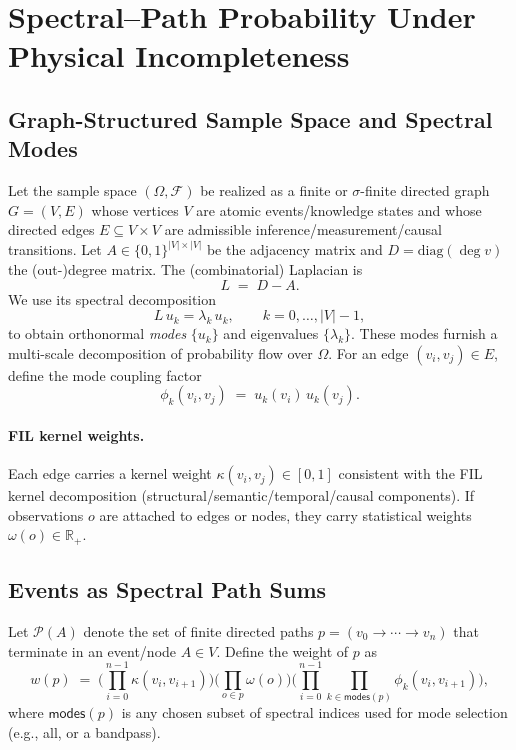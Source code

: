 \section{Spectral–Path Probability Under Physical Incompleteness}
\label{sec:spectral-path-prob-PI}

\subsection{Graph-Structured Sample Space and Spectral Modes}
\label{subsec:sample-graph-spectral}

Let the sample space $(\Omega,\mathcal{F})$ be realized as a finite or $\sigma$-finite directed graph
$G=(V,E)$ whose vertices $V$ are atomic events/knowledge states and whose directed edges
$E\subseteq V\times V$ are admissible inference/measurement/causal transitions.
Let $A\in\{0,1\}^{|V|\times|V|}$ be the adjacency matrix and $D=\mathrm{diag}(\deg v)$ the
(out-)degree matrix. The (combinatorial) Laplacian is
\[
L \;=\; D-A.
\]
We use its spectral decomposition
\[
L\,u_k=\lambda_k\,u_k,\qquad k=0,\dots,|V|-1,
\]
to obtain orthonormal \emph{modes} $\{u_k\}$ and eigenvalues $\{\lambda_k\}$. These modes furnish a
multi-scale decomposition of probability flow over $\Omega$.
For an edge $(v_i,v_j)\in E$, define the mode coupling factor
\begin{equation}
\phi_k(v_i,v_j)\;=\;u_k(v_i)\,u_k(v_j).
\label{eq:mode-coupling}
\end{equation}

\paragraph{FIL kernel weights.}
Each edge carries a kernel weight $\kappa(v_i,v_j)\in[0,1]$ consistent with the FIL kernel
decomposition (structural/semantic/temporal/causal components).
If observations $o$ are attached to edges or nodes, they carry statistical weights $\omega(o)\in\mathbb{R}_+$.

\subsection{Events as Spectral Path Sums}
\label{subsec:events-as-path-sums}

Let $\mathcal{P}(A)$ denote the set of finite directed paths $p=(v_0\!\to\!\cdots\!\to\!v_n)$ that
terminate in an event/node $A\in V$. Define the weight of $p$ as
\begin{equation}
w(p)\;=\;\Bigg(\prod_{i=0}^{n-1}\kappa(v_i,v_{i+1})\Bigg)
         \Bigg(\prod_{o\in p}\omega(o)\Bigg)
         \Bigg(\prod_{i=0}^{n-1}\prod_{k\in \mathsf{modes}(p)}\phi_k(v_i,v_{i+1})\Bigg),
\label{eq:path-weight}
\end{equation}
where $\mathsf{modes}(p)$ is any chosen subset of spectral indices used for mode selection (e.g., all, or a bandpass).

